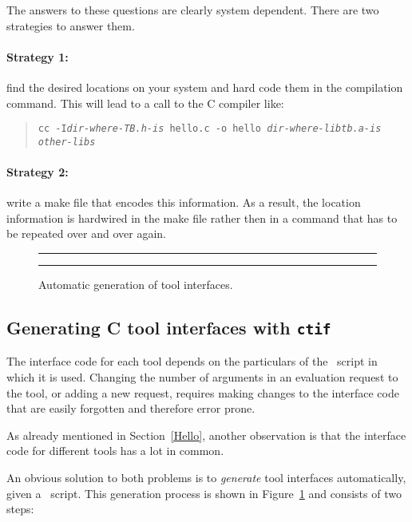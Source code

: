 \documentclass[a4,twoside,noweb]{article} %
\begin{document}
The answers to these questions are clearly system dependent.
There are two strategies to answer them.

\paragraph{Strategy 1:} find the desired locations on your system and hard code them in
the compilation command. This will lead to a call to the C compiler
like:
\begin{quote}
{\tt cc -I{\em dir-where-TB.h-is} hello.c -o hello {\em dir-where-libtb.a-is} {\em other-libs}}
\end{quote}

\paragraph{Strategy 2:}  write a make file that encodes this information.
As a result, the location information is hardwired in the make file
rather then in a command that has to be repeated over and over again.

\begin{figure}
\rule{\textwidth}{0.5mm}
    
  \centerline{\box\graph}
  \caption{Automatic generation of tool interfaces.}
  \label{fig:Tifs}
\rule{\textwidth}{0.5mm}
\end{figure}

\subsection{\label{ctif}Generating C tool interfaces with {\tt ctif}}

The interface code for each tool depends on the particulars
of the \T\ script in which it is used. Changing the number
of arguments in an evaluation request to the tool,
or adding a new request, requires making changes to the interface
code that are easily forgotten and therefore error prone.

As already mentioned in Section~\ref{Hello}, another observation
is that the interface code for different tools has a lot in common.

An obvious solution to both problems is to {\em generate}
tool interfaces automatically, given a \T\ script.
This generation process is shown in Figure~\ref{fig:Tifs}
and consists of two steps:
\end{document}
